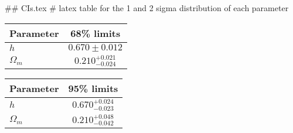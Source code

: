 ## CIs.tex
# latex table for the 1 and 2 sigma distribution of each parameter

\begin{tabular} { l  c}
 Parameter &  68\% limits\\
\hline
{\boldmath$h              $} & $0.670\pm 0.012            $\\
{\boldmath$\Omega_m       $} & $0.210^{+0.021}_{-0.024}   $\\
\hline
\end{tabular}

\begin{tabular} { l  c}
 Parameter &  95\% limits\\
\hline
{\boldmath$h              $} & $0.670^{+0.024}_{-0.023}   $\\
{\boldmath$\Omega_m       $} & $0.210^{+0.048}_{-0.042}   $\\
\hline
\end{tabular}

